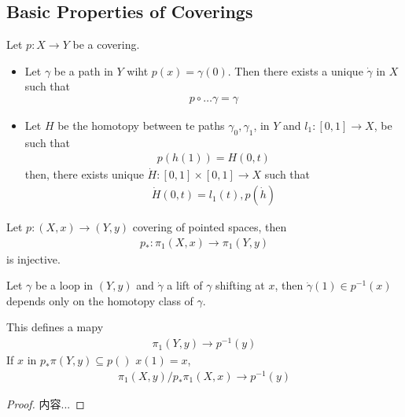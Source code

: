 \documentclass[Total.tex]{subfiles}
\begin{document}
			\subsection{Basic Properties of Coverings}
			\begin{proposition}
				Let $p:X\rightarrow Y$ be a covering. 
				\begin{itemize}
					\item Let $\gamma$ be a path in $Y$ wiht $p(x)=\gamma(0)$. Then there exists a unique $\dot{\gamma}$ in $X$ such that
					\begin{gather*}
						p\circ \dots{\gamma}=\gamma
					\end{gather*}
					\item Let $H$ be the homotopy between te paths $\gamma_0,\gamma_1$, in $Y$ and $l_1:[0,1]\rightarrow X$, be such that
					\begin{gather*}
						p(h(1))=H(0,t)
					\end{gather*}
					then, there exists unique $\dot{H}:[0,1]\times [0,1]\rightarrow X$ such that
					\begin{gather*}
						\dot{H}(0,t)=l_1(t),p(\dot{h})
					\end{gather*}
				\end{itemize}
				
				\begin{corollary}
					Let $p:(X,x)\rightarrow (Y,y)$ covering of pointed spaces, then
					\begin{gather*}
						p_*:\pi_1(X,x)\rightarrow \pi_1(Y,y)
					\end{gather*}
					is injective.
				\end{corollary}
				
				\begin{corollary}
					Let $\gamma$ be a loop in $(Y,y)$ and $\dot{\gamma}$ a lift of $\gamma$ shifting at $x$, then $\dot{\gamma}(1)\in p^{-1}(x)$ depends only on the homotopy class of $\gamma$.
					
					This  defines a mapy
					\begin{gather*}
						\pi_1(Y,y)\rightarrow p^{-1}(y)
					\end{gather*}
					If $x$ in $p_*\pi(Y,y)\subseteq p()$ $x(1)=x$,
					\begin{gather*}
						\pi_1(X,y)/p_*\pi_1(X,x)\rightarrow p^{-1}(y)
					\end{gather*}
				\end{corollary}
				\begin{proof}
					内容...
				\end{proof}
				

\end{proposition}
\end{document}
